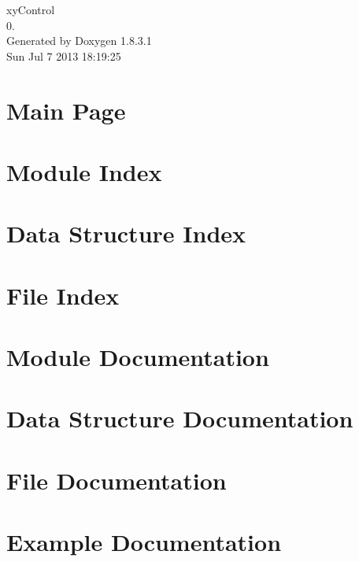 \documentclass{book}
\begin{document}
\hypersetup{pageanchor=false,citecolor=blue}
\begin{titlepage}
\vspace*{7cm}
\begin{center}
{\Large xy\-Control \\[1ex]\large 0. }\\
\vspace*{1cm}
{\large Generated by Doxygen 1.8.3.1}\\
\vspace*{0.5cm}
{\small Sun Jul 7 2013 18:19:25}\\
\end{center}
\end{titlepage}
\clearemptydoublepage
{}
\tableofcontents
\clearemptydoublepage
{}
\hypersetup{pageanchor=true,citecolor=blue}
\chapter{Main Page}
\label{index}\hypertarget{index}{}
\chapter{Module Index}

\chapter{Data Structure Index}

\chapter{File Index}

\chapter{Module Documentation}














\chapter{Data Structure Documentation}


\chapter{File Documentation}






















\chapter{Example Documentation}

\printindex
\end{document}
